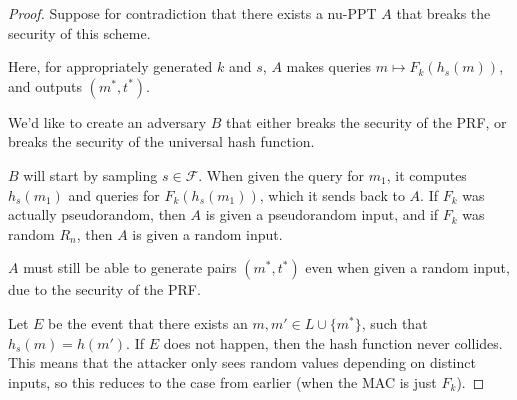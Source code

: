 \begin{proof}
    Suppose for contradiction that there exists a nu-PPT $A$ that breaks the security of this scheme.

    Here, for appropriately generated $k$ and $s$, $A$ makes queries $m \mapsto F_k(h_s(m))$, and outputs $(m^*, t^*)$.

    We'd like to create an adversary $B$ that either breaks the security of the PRF, or breaks the security of the universal hash function.

    $B$ will start by sampling $s \in \mathcal{F}$. When given the query for $m_1$, it computes $h_s(m_1)$ and queries for $F_k(h_s(m_1))$, which it sends back to $A$. If $F_k$ was actually pseudorandom, then $A$ is given a pseudorandom input, and if $F_k$ was random $R_n$, then $A$ is given a random input.

    $A$ must still be able to generate pairs $(m^*, t^*)$ even when given a random input, due to the security of the PRF.

    \begin{center}
    \end{center}

    Let $E$ be the event that there exists an $m, m' \in L \cup \{m^*\}$, such that $h_s(m) = h(m')$. If $E$ does not happen, then the hash function never collides. This means that the attacker only sees random values depending on distinct inputs, so this reduces to the case from earlier (when the MAC is just $F_k$).


\end{proof}
